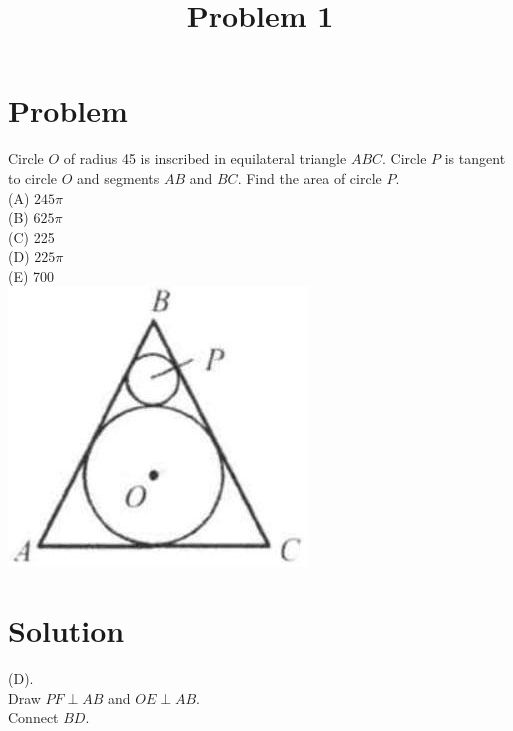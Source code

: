 \documentclass{article}
\title{Problem 1}
\date{}
\begin{document}
\maketitle

\section*{Problem}
Circle \(O\) of radius 45 is inscribed in equilateral triangle \(A B C\). Circle \(P\) is tangent to circle \(O\) and segments \(A B\) and \(B C\). Find the area of circle \(P\).\\
(A) \(245 \pi\)\\
(B) \(625 \pi\)\\
(C) 225\\
(D) \(225 \pi\)\\
(E) 700\\
\centering
\includegraphics[width=\textwidth]{images/problem_image_1.jpg}

\section*{Solution}
(D).\\
Draw \(P F \perp A B\) and \(O E \perp A B\).\\
Connect \(B D\).
\end{document}
